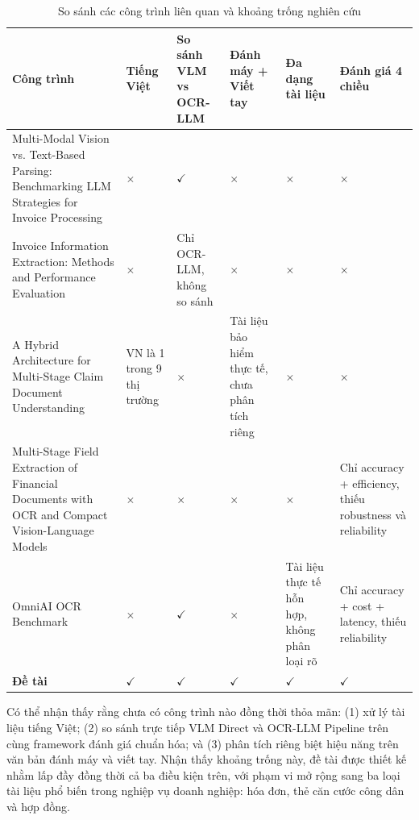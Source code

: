 ﻿\documentclass[12pt]{report}
\begin{document}
\begin{table}[h]
\centering
\caption{So sánh các công trình liên quan và khoảng trống nghiên cứu}
\label{tab:research_gap}
\footnotesize
\renewcommand{\arraystretch}{1.3}
\begin{tabular}{|p{4cm}|p{1.7cm}|p{2.1cm}|p{2cm}|p{2.2cm}|p{2.4cm}|}
\hline
\textbf{Công trình} & \textbf{Tiếng Việt} & \textbf{So sánh VLM vs OCR-LLM} & \textbf{Đánh máy + Viết tay} & \textbf{Đa dạng tài liệu} & \textbf{Đánh giá 4 chiều} \\ \hline
Multi-Modal Vision vs. Text-Based Parsing: Benchmarking LLM Strategies for Invoice Processing & $\times$ & $\checkmark$ & $\times$ & $\times$ & $\times$ \\ \hline
Invoice Information Extraction: Methods and Performance Evaluation & $\times$ & Chỉ OCR-LLM, không so sánh & $\times$ & $\times$ & $\times$ \\ \hline
A Hybrid Architecture for Multi-Stage Claim Document Understanding & VN là 1 trong 9 thị trường & $\times$ & Tài liệu bảo hiểm thực tế, chưa phân tích riêng & $\times$ & $\times$ \\ \hline
Multi-Stage Field Extraction of Financial Documents with OCR and Compact Vision-Language Models & $\times$ & $\times$ & $\times$ & $\times$ & Chỉ accuracy + efficiency, thiếu robustness và reliability \\ \hline
OmniAI OCR Benchmark & $\times$ & $\checkmark$ & $\times$ & Tài liệu thực tế hỗn hợp, không phân loại rõ & Chỉ accuracy + cost + latency, thiếu reliability \\ \hline
\rowcolor{yellow!25}
\textbf{Đề tài} & \textbf{$\checkmark$} & \textbf{$\checkmark$} & \textbf{$\checkmark$} & \textbf{$\checkmark$} & \textbf{$\checkmark$} \\ \hline
\end{tabular}
\end{table}

Có thể nhận thấy rằng chưa có công trình nào đồng thời thỏa mãn: (1) xử lý tài liệu tiếng Việt; (2) so sánh trực tiếp VLM Direct và OCR-LLM Pipeline trên cùng framework đánh giá chuẩn hóa; và (3) phân tích riêng biệt hiệu năng trên văn bản đánh máy và viết tay. Nhận thấy khoảng trống này, đề tài được thiết kế nhằm lấp đầy đồng thời cả ba điều kiện trên, với phạm vi mở rộng sang ba loại tài liệu phổ biến trong nghiệp vụ doanh nghiệp: hóa đơn, thẻ căn cước công dân và hợp đồng.

\clearpage

\end{document}
